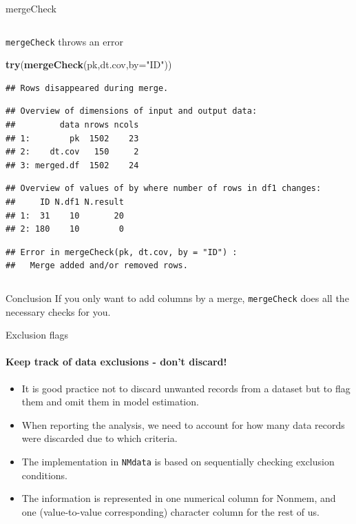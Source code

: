 \documentclass[
  8pt,
  ignorenonframetext,
  aspectratio=169]{beamer}
\newenvironment{Shaded}{\begin{snugshade}}{\end{snugshade}}
\newcommand{\DataTypeTok}[1]{\textcolor[rgb]{0.13,0.29,0.53}{#1}}
\newcommand{\KeywordTok}[1]{\textcolor[rgb]{0.13,0.29,0.53}{\textbf{#1}}}
\newcommand{\NormalTok}[1]{#1}
\newcommand{\StringTok}[1]{\textcolor[rgb]{0.31,0.60,0.02}{#1}}
\begin{document}
\begin{frame}[fragile]{mergeCheck}
\begin{columns}[T]
\begin{column}{0.48\textwidth}
\begin{block}{\texttt{mergeCheck} throws an error}
\begin{Shaded}
\begin{Highlighting}[]
\KeywordTok{try}\NormalTok{(}\KeywordTok{mergeCheck}\NormalTok{(pk,dt.cov,}\DataTypeTok{by=}\StringTok{"ID"}\NormalTok{))}
\end{Highlighting}
\end{Shaded}

\begin{verbatim}
## Rows disappeared during merge.
\end{verbatim}

\begin{verbatim}
## Overview of dimensions of input and output data:
##         data nrows ncols
## 1:        pk  1502    23
## 2:    dt.cov   150     2
## 3: merged.df  1502    24
\end{verbatim}

\begin{verbatim}
## Overview of values of by where number of rows in df1 changes:
##     ID N.df1 N.result
## 1:  31    10       20
## 2: 180    10        0
\end{verbatim}

\begin{verbatim}
## Error in mergeCheck(pk, dt.cov, by = "ID") : 
##   Merge added and/or removed rows.
\end{verbatim}
\end{block}
\end{column}

\normalsize
\end{columns}

\begin{block}{Conclusion}
\protect\hypertarget{conclusion}{}
If you only want to add columns by a merge, \texttt{mergeCheck} does all
the necessary checks for you.
\end{block}
\end{frame}

\begin{frame}[fragile]{Exclusion flags}
\protect\hypertarget{exclusion-flags}{}
\framesubtitle{Keep track of data exclusions - don't discard!}

\begin{itemize}
\item
  It is good practice not to discard unwanted records from a dataset but
  to flag them and omit them in model estimation.
\item
  When reporting the analysis, we need to account for how many data
  records were discarded due to which criteria.
\item
  The implementation in \texttt{NMdata} is based on sequentially
  checking exclusion conditions.
\item
  The information is represented in one numerical column for Nonmem, and
  one (value-to-value corresponding) character column for the rest of
  us.
\end{itemize}
\end{frame}
\end{document}
